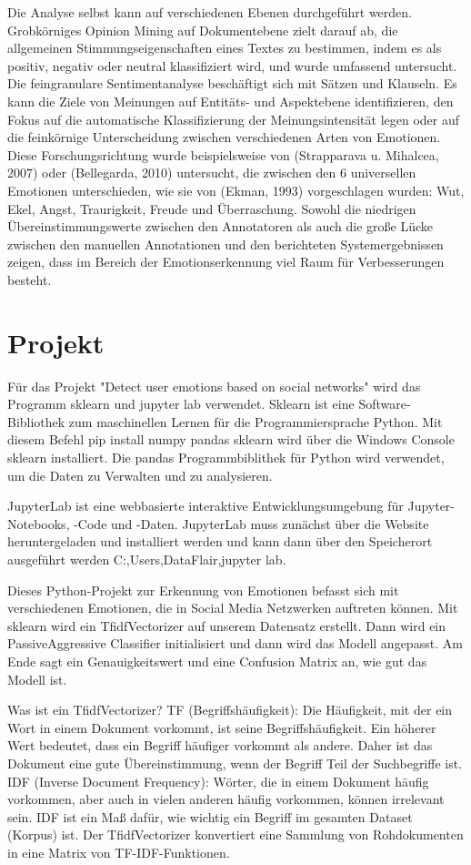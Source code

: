 \documentclass[conference]{IEEEtran}
\begin{document}
Die Analyse selbst kann auf verschiedenen Ebenen durchgeführt werden. Grobkörniges Opinion Mining auf Dokumentebene zielt darauf ab, die allgemeinen Stimmungseigenschaften eines Textes zu bestimmen, indem es als positiv, negativ oder neutral klassifiziert wird, und wurde umfassend untersucht. Die feingranulare Sentimentanalyse beschäftigt sich mit Sätzen und Klauseln. Es kann die Ziele von Meinungen auf Entitäts- und Aspektebene identifizieren, den Fokus auf die automatische Klassifizierung der Meinungsintensität legen oder auf die feinkörnige Unterscheidung zwischen verschiedenen Arten von Emotionen. Diese Forschungsrichtung wurde beispielsweise von (Strapparava u. Mihalcea, 2007) oder (Bellegarda, 2010) untersucht, die zwischen den 6 universellen Emotionen unterschieden, wie sie von (Ekman, 1993) vorgeschlagen wurden: Wut, Ekel, Angst, Traurigkeit, Freude und Überraschung. Sowohl die niedrigen Übereinstimmungswerte zwischen den Annotatoren als auch die große Lücke zwischen den manuellen Annotationen und den berichteten Systemergebnissen zeigen, dass im Bereich der Emotionserkennung viel Raum für Verbesserungen besteht.\cite{b4}

\section{Projekt}
Für das Projekt "Detect user emotions based on social networks" wird das Programm sklearn und jupyter lab verwendet. 
Sklearn ist eine Software-Bibliothek zum maschinellen Lernen für die Programmiersprache Python. Mit diesem Befehl 
pip install numpy pandas sklearn wird über die Windows Console sklearn installiert.
Die pandas Programmbiblithek für Python wird verwendet, um die Daten zu Verwalten und zu analysieren.

JupyterLab ist eine webbasierte interaktive Entwicklungsumgebung für Jupyter-Notebooks, -Code und -Daten. JupyterLab muss zunächst über die Website heruntergeladen und installiert werden und kann dann über den Speicherort ausgeführt werden C:,Users,DataFlair,jupyter lab.

Dieses Python-Projekt zur Erkennung von Emotionen befasst sich mit verschiedenen Emotionen, die in Social Media Netzwerken auftreten können. Mit sklearn wird ein TfidfVectorizer auf unserem Datensatz erstellt. Dann wird ein PassiveAggressive Classifier initialisiert und dann wird das Modell angepasst. Am Ende sagt ein Genauigkeitswert und eine Confusion Matrix an, wie gut das Modell ist.

Was ist ein TfidfVectorizer?
TF (Begriffshäufigkeit): Die Häufigkeit, mit der ein Wort in einem Dokument vorkommt, ist seine Begriffshäufigkeit. Ein höherer Wert bedeutet, dass ein Begriff häufiger vorkommt als andere. Daher ist das Dokument eine gute Übereinstimmung, wenn der Begriff Teil der Suchbegriffe ist.
IDF (Inverse Document Frequency): Wörter, die in einem Dokument häufig vorkommen, aber auch in vielen anderen häufig vorkommen, können irrelevant sein. IDF ist ein Maß dafür, wie wichtig ein Begriff im gesamten Dataset (Korpus) ist.
Der TfidfVectorizer konvertiert eine Sammlung von Rohdokumenten in eine Matrix von TF-IDF-Funktionen.
\end{document}
